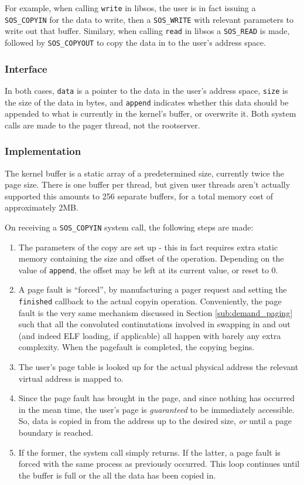 \documentclass[12pt,english]{article}
\begin{document}
For example, when calling \texttt{write} in libsos, the user is in fact issuing a \texttt{SOS\_COPYIN} for the data to write, then a \texttt{SOS\_WRITE} with relevant parameters to write out that buffer.  Similary, when calling \texttt{read} in libsos a \texttt{SOS\_READ} is made, followed by \texttt{SOS\_COPYOUT} to copy the data in to the user's address space.

\subsubsection{Interface}

In both cases, \texttt{data} is a pointer to the data in the user's address space, \texttt{size} is the size of the data in bytes, and \texttt{append} indicates whether this data should be appended to what is currently in the kernel's buffer, or overwrite it.  Both system calls are made to the pager thread, not the rootserver.

\subsubsection{Implementation}

The kernel buffer is a static array of a predetermined size, currently twice the page size.  There is one buffer per thread, but given user threads aren't actually supported this amounts to 256 separate buffers, for a total memory cost of approximately 2MB.

On receiving a \texttt{SOS\_COPYIN} system call, the following steps are made:
\begin{enumerate}
\item The parameters of the copy are set up - this in fact requires extra static memory containing the size and offset of the operation.  Depending on the value of \texttt{append}, the offset may be left at its current value, or reset to 0.
\item A page fault is ``forced'', by manufacturing a pager request and setting the \texttt{finished} callback to the actual copyin operation.  Conveniently, the page fault is the very same mechanism discussed in Section \ref{sub:demand_paging} such that all the convoluted continutations involved in swapping in and out (and indeed ELF loading, if applicable) all happen with barely any extra complexity.  When the pagefault is completed, the copying begins.
\item The user's page table is looked up for the actual physical address the relevant virtual address is mapped to.
\item Since the page fault has brought in the page, and since nothing has occurred in the mean time, the user's page is \emph{guaranteed} to be immediately accessible.  So, data is copied in from the address up to the desired size, \emph{or} until a page boundary is reached.
\item If the former, the system call simply returns.  If the latter, a page fault is forced with the same process as previously occurred.  This loop continues until the buffer is full or the all the data has been copied in.
\end{enumerate}
\end{document}
